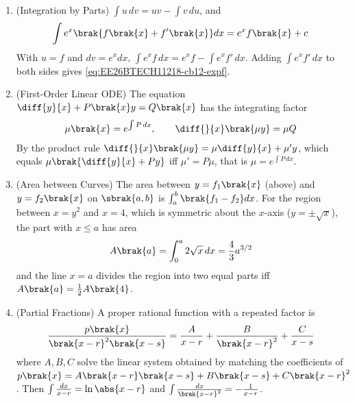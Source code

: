 \begin{enumerate}[label=\thesubsection.\arabic*, ref=\thesubsection.\theenumi,itemsep=1.5em]
\item (Integration by Parts) $\int u\,dv = uv-\int v\,du$, and
\begin{align}
\int e^x\brak{f\brak{x}+f'\brak{x}}dx = e^xf\brak{x}+c
\label{eq:EE26BTECH11218-cb12-expf}
\end{align}
\solution With $u=f$ and $dv=e^xdx$, $\int e^xf\,dx = e^xf-\int e^xf'\,dx$. Adding $\int e^xf'\,dx$ to both sides gives \eqref{eq:EE26BTECH11218-cb12-expf}.

\item (First-Order Linear ODE) The equation $\diff{y}{x}+P\brak{x}y=Q\brak{x}$ has the integrating factor
\begin{align}
\mu\brak{x} = e^{\int P\,dx}, \qquad \diff{}{x}\brak{\mu y} = \mu Q
\label{eq:EE26BTECH11218-cb12-linode}
\end{align}
\solution By the product rule $\diff{}{x}\brak{\mu y} = \mu\diff{y}{x}+\mu'y$, which equals $\mu\brak{\diff{y}{x}+Py}$ iff $\mu'=P\mu$, that is $\mu=e^{\int P\,dx}$.

\item (Area between Curves) The area between $y=f_1\brak{x}$ (above) and $y=f_2\brak{x}$ on $\sbrak{a,b}$ is $\int_a^b\brak{f_1-f_2}dx$. For the region between $x=y^2$ and $x=4$, which is symmetric about the $x$-axis ($y=\pm\sqrt{x}$), the part with $x\le a$ has area
\begin{align}
A\brak{a} = \int_0^a2\sqrt{x}\,dx = \frac{4}{3}a^{3/2}
\label{eq:EE26BTECH11218-cb12-area}
\end{align}
and the line $x=a$ divides the region into two equal parts iff $A\brak{a}=\frac{1}{2}A\brak{4}$.

\item (Partial Fractions) A proper rational function with a repeated factor is
\begin{align}
\frac{p\brak{x}}{\brak{x-r}^2\brak{x-s}} = \frac{A}{x-r}+\frac{B}{\brak{x-r}^2}+\frac{C}{x-s}
\label{eq:EE26BTECH11218-cb12-partial}
\end{align}
where $A,B,C$ solve the linear system obtained by matching the coefficients of $p\brak{x}=A\brak{x-r}\brak{x-s}+B\brak{x-s}+C\brak{x-r}^2$. Then $\int\frac{dx}{x-r}=\ln\abs{x-r}$ and $\int\frac{dx}{\brak{x-r}^2}=-\frac{1}{x-r}$.
\end{enumerate}
